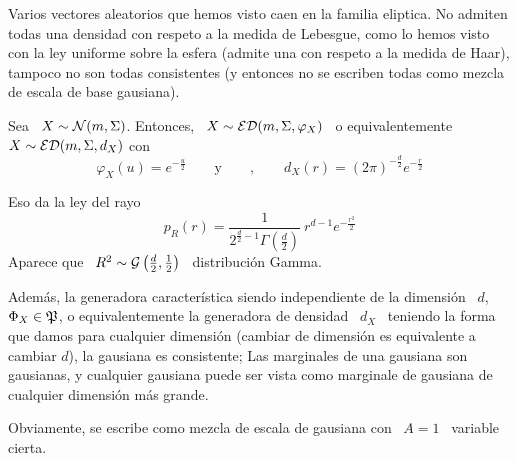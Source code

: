 Varios  vectores aleatorios que  hemos visto  caen en  la familia  eliptica.  No
admiten todas  una densidad con respeto a  la medida de Lebesgue,  como lo hemos
visto con la ley uniforme sobre la esfera (admite una con respeto a la medida de
Haar), tampoco no  son todas consistentes (y entonces no  se escriben todas como
mezcla de escala de base gausiana).
%
\begin{ejemplo}
%
  Sea \ $X \sim \mathcal{N}(m,\Sigma)$.  Entonces, \ $X \sim \mathcal{ED}(m,\Sigma,\varphi_X)$ \ o
  equivalentemente \ $X \sim \mathcal{ED}(m,\Sigma,d_X)$ con
  \[
  \varphi_X(u) =  e^{-\frac{u}{2}} \qquad \mbox{y}  \qquad , \qquad d_X(r)  = (2
  \pi)^{-\frac{d}{2}} e^{- \frac{r}{2}}
  \]
  
  Eso da la ley del rayo
  \[
  p_R(r)  =  \frac{1}{2^{\frac{d}{2}-1}  \Gamma\left(  \frac{d}{2}  \right)}  \:
  r^{d-1} e^{- \frac{r^2}{2}}
  \]
  Aparece   que  \   $R^2  \sim   \mathcal{G}\left(  \frac{d}{2}   ,   \frac12\right)$  \
  distribuci\'on Gamma.
  
  Adem\'as,   la  generadora   caracter\'istica  siendo   independiente   de  la
  dimensi\'on \  $d$, \  $\Phi_X \in \mathfrak{P}$,  o equivalentemente la  generadora de
  densidad  \ $d_X$ \  teniendo la  forma que  damos para  cualquier dimensi\'on
  (cambiar  de  dimensi\'on  es  equivalente  a cambiar  $d$),  la  gausiana  es
  consistente;  Las  marginales  de  una  gausiana son  gausianas,  y  cualquier
  gausiana puede ser  vista como marginale de gausiana  de cualquier dimensi\'on
  m\'as grande.

  Obviamente, se  escribe como  mezcla de  escala de gausiana  con \  $A =  1$ \
  variable cierta.
\end{ejemplo}

